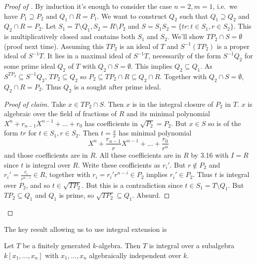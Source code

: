 \documentclass[a4paper]{article}
\begin{document}
\begin{proof}[Proof of ]
  By induction it's enough to consider the case \(n = 2, m = 1\), i.e.\ we have \(P_1 \supseteq P_2\) and \(Q_1 \cap R = P_1\). We want to construct \(Q_2\) such that \(Q_1 \supseteq Q_2\) and \(Q_2 \cap R = P_2\). Let \(S_1 = T \setminus Q_1, S_2 = R \setminus P_2\) and \(S = S_1S_2 = \{tr: t \in S_1, r \in S_2\}\). This is multiplicatively closed and contains both \(S_1\) and \(S_2\). We'll show \(TP_2 \cap S = \emptyset\) (proof next time). Assuming this \(TP_2\) is an ideal of \(T\) and \(S^{-1}(TP_2)\) is a proper ideal of \(S^{-1}T\). It lies in a maximal ideal of \(S^{-1}T\), necessarily of the form \(S^{-1}Q_2\) for some prime ideal \(Q_2\) of \(T\) with \(Q_2 \cap S = \emptyset\). This implies \(Q_2 \subseteq Q_1\). As \(S^{TP_2} \subseteq S^{-1}Q_2\), \(TP_2 \subseteq Q_2\) so \(P_2 \subseteq TP_2 \cap R \subseteq Q_2 \cap R\). Together with \(Q_2 \cap S = \emptyset\), \(Q_2 \cap R = P_2\). Thus \(Q_2\) is a sought after prime ideal.

  \begin{proof}[Proof of claim]
    Take \(x \in TP_2 \cap S\). Then \(x\) is in the integral closure of \(P_2\) in \(T\). \(x\) is algebraic over the field of fractions of \(R\) and its minimal polynomial \(X^n + r_{n - 1} X^{n - 1} + \dots + r_0\) has coefficients in \(\sqrt{P_2} = P_2\). But \(x \in S\) so is of the form \(tr\) for \(t \in S_1, r \in S_2\). Then \(t = \frac{x}{r}\) has minimal polynomial
    \[
      X^n + \frac{r_{n -1}}{r} X^{n - 1} + \dots + \frac{r_0}{r^n}
    \]
    and those coefficients are in \(R\). All these coefficients are in \(R\) by 3.16 with \(I = R\) since \(t\) is integral over \(R\). Write these ceofficients as \(r_i'\). But \(r \notin P_2\) and \(r_i' = \frac{r_i}{r^{n - i}} \in R\), together with \(r_i = r_i' r^{n - i} \in P_2\) implies \(r_i' \in P_2\). Thus \(t\) is integral over \(P_2\), and so \(t \in \sqrt{TP_2}\). But this is a contradiction since \(t \in S_1 = T \setminus Q_1\). But \(TP_2 \subseteq Q_1\) and \(Q_1\) is prime, so \(\sqrt{TP_2} \subseteq Q_1\). Absurd.
  \end{proof}
\end{proof}

The key result allowing us to use integral extension is

\begin{lemma}
  Let \(T\) be a finitely generated \(k\)-algebra. Then \(T\) is integral over a subalgebra \(k[x_1, \dots, x_n]\) with \(x_1, \dots, x_n\) algebraically independent over \(k\).
\end{lemma}
\end{document}
